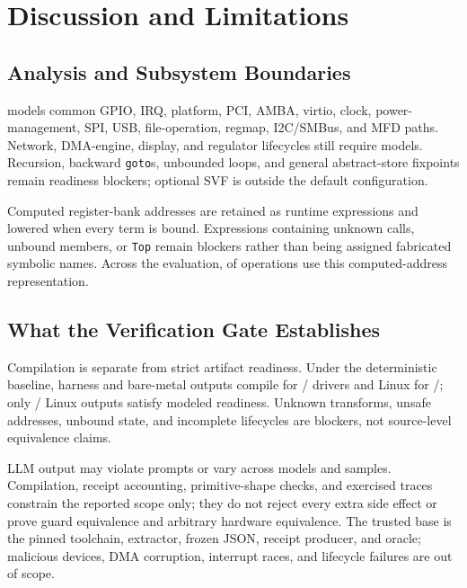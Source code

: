
\section{Discussion and Limitations}
\label{sec:discussion}

\subsection{Analysis and Subsystem Boundaries}

\reharness{} models common GPIO, IRQ, platform, PCI, AMBA, virtio, clock,
power-management, SPI, USB, file-operation, regmap, I2C/SMBus, and MFD paths.
Network, DMA-engine, display, and regulator lifecycles still require models.
Recursion, backward \texttt{goto}s, unbounded loops, and general abstract-store
fixpoints remain readiness blockers; optional SVF is outside the default
configuration.

Computed register-bank addresses are retained as runtime expressions and lowered when every term is bound. Expressions containing unknown calls, unbound members, or \texttt{Top} remain blockers rather than being assigned fabricated symbolic names. Across the evaluation, \EvalComputed{} of \EvalOps{} operations use this computed-address representation.

\subsection{What the Verification Gate Establishes}

Compilation is separate from strict artifact readiness. Under the deterministic
baseline, harness and bare-metal outputs compile for \HarnessCompileCount{}/\EvalDrivers{}
drivers and Linux for \LinuxCompileCount{}/\EvalDrivers{}; only
\LinuxReadyCount{}/\EvalDrivers{} Linux outputs satisfy modeled readiness.
Unknown transforms, unsafe addresses, unbound state, and incomplete lifecycles
are blockers, not source-level equivalence claims.

LLM output may violate prompts or vary across models and samples. Compilation,
receipt accounting, primitive-shape checks, and exercised traces constrain the
reported scope only; they do not reject every extra side effect or prove guard
equivalence and arbitrary hardware equivalence. The trusted base is the pinned
toolchain, extractor, frozen JSON, receipt producer, and oracle; malicious
devices, DMA corruption, interrupt races, and lifecycle failures are out of scope.

